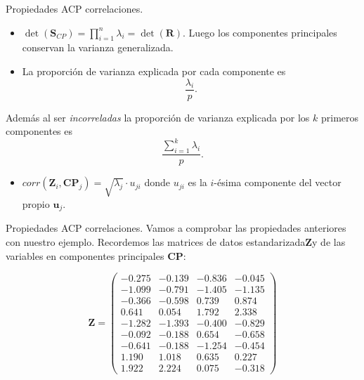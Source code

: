 \documentclass[
  ignorenonframetext,
]{beamer}
\providecommand{\tightlist}{%
  \setlength{\itemsep}{0pt}\setlength{\parskip}{0pt}}
\begin{document}
\begin{frame}{Propiedades ACP correlaciones.}
\label{propiedades-acp-correlaciones.-3}
\begin{itemize}
\item
  \(\det(\mathbf{S}_{CP})=\prod_{i=1}^n \lambda_i =\det(\mathbf{R})\).
  Luego los componentes principales conservan la varianza generalizada.
\item
  La proporción de varianza explicada por cada componente es
  \[\frac{\lambda_i}{p}.\]
\end{itemize}

Además al ser \emph{incorreladas} la proporción de varianza explicada
por los \(k\) primeros componentes es
\[\frac{\sum_{i=1}^k \lambda_i}{p}.\]

\begin{itemize}
\tightlist
\item
  \(corr(\mathbf{Z}_i, \mathbf{CP}_j)=\sqrt{\lambda_j}\cdot u_{j i}\)
  donde \(u_{j i}\) es la \(i\)-ésima componente del vector propio
  \(\mathbf{u}_j\).
\end{itemize}
\end{frame}

\begin{frame}{Propiedades ACP correlaciones.}
\label{propiedades-acp-correlaciones.-4}
Vamos a comprobar las propiedades anteriores con nuestro ejemplo.
Recordemos las matrices de datos estandarizada\(\mathbf{Z}\)y de las
variables en componentes principales \(\mathbf{CP}\):

\[
\mathbf{Z}=
\begin{pmatrix}
-0.275 & -0.139 & -0.836 & -0.045 \\
 -1.099 & -0.791 & -1.405 & -1.135 \\
 -0.366 & -0.598 & 0.739 & 0.874 \\
 0.641 & 0.054 & 1.792 & 2.338 \\
 -1.282 & -1.393 & -0.400 & -0.829 \\
 -0.092 & -0.188 & 0.654 & -0.658 \\
 -0.641 & -0.188 & -1.254 & -0.454 \\
 1.190 & 1.018 & 0.635 & 0.227 \\
 1.922 & 2.224 & 0.075 & -0.318 
\end{pmatrix}
\]
\end{frame}
\end{document}

